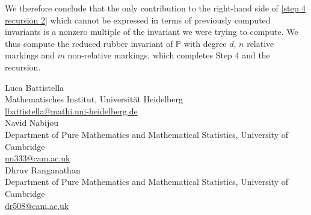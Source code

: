 \documentclass[11pt]{amsart}
\newcommand{\PP}{\mathbb P}
\theoremstyle{definition}
\theoremstyle{definition}
\begin{document}
We therefore conclude that the only contribution to the right-hand side of \eqref{step 4 recursion 2} which cannot be expressed in terms of previously computed invariants is a nonzero multiple of the invariant we were trying to compute. We thus compute the reduced rubber invariant of $\PP$ with degree $d$, $n$ relative markings and $m$ non-relative markings, which completes Step 4 and the recursion.

\footnotesize




\bigskip\bigskip

\noindent Luca Battistella\\
Mathematisches Institut, Universit\"at Heidelberg \\
\href{mailto:lbattistella@mathi.uni-heidelberg.de}{lbattistella@mathi.uni-heidelberg.de}\\

\noindent Navid Nabijou \\
Department of Pure Mathematics and Mathematical Statistics, University of Cambridge \\
\href{mailto:nn333@cam.ac.uk}{nn333@cam.ac.uk}\\

\noindent Dhruv Ranganathan \\
Department of Pure Mathematics and Mathematical Statistics, University of Cambridge \\
\href{mailto:dr508@cam.ac.uk}{dr508@cam.ac.uk}
\end{document}
